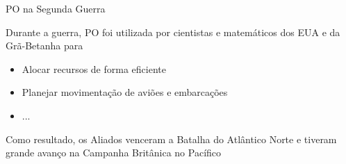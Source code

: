 \documentclass[compress]{beamer}
\begin{document}

\begin{frame}{PO na Segunda Guerra}

Durante a guerra, PO foi utilizada por cientistas e matemáticos dos EUA e da Grã-Betanha para

\begin{itemize}
    \item Alocar recursos de forma eficiente
    \item Planejar movimentação de aviões e embarcações
    \item ...
\end{itemize}

\vspace{0.5cm}

Como resultado, os Aliados venceram a Batalha do Atlântico Norte e tiveram grande avanço na Campanha Britânica no Pacífico
\end{frame}

\end{document}
